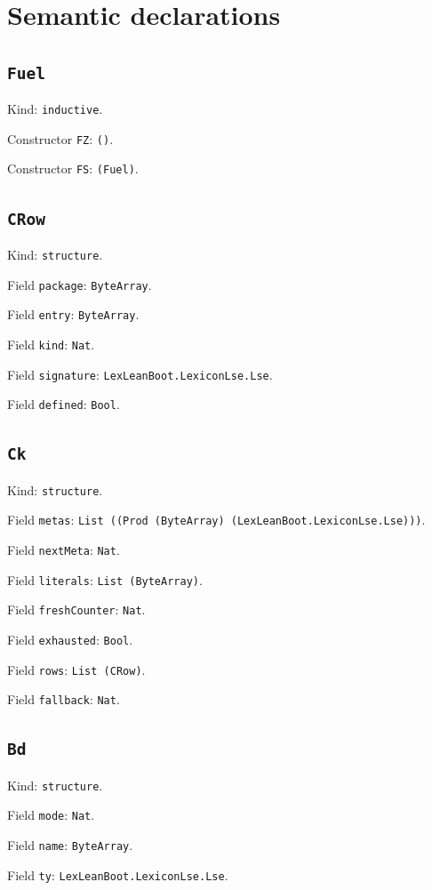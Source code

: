 \documentclass[11pt]{article}
\begin{document}
\section*{Semantic declarations}
\subsection*{\texttt{Fuel}}
\noindent Kind: \texttt{inductive}.\par
\noindent Constructor \texttt{FZ}: \texttt{()}.\par
\noindent Constructor \texttt{FS}: \texttt{(Fuel)}.\par
\subsection*{\texttt{CRow}}
\noindent Kind: \texttt{structure}.\par
\noindent Field \texttt{package}: \texttt{ByteArray}.\par
\noindent Field \texttt{entry}: \texttt{ByteArray}.\par
\noindent Field \texttt{kind}: \texttt{Nat}.\par
\noindent Field \texttt{signature}: \texttt{LexLeanBoot.LexiconLse.Lse}.\par
\noindent Field \texttt{defined}: \texttt{Bool}.\par
\subsection*{\texttt{Ck}}
\noindent Kind: \texttt{structure}.\par
\noindent Field \texttt{metas}: \texttt{List ((Prod (ByteArray) (LexLeanBoot.LexiconLse.Lse)))}.\par
\noindent Field \texttt{nextMeta}: \texttt{Nat}.\par
\noindent Field \texttt{literals}: \texttt{List (ByteArray)}.\par
\noindent Field \texttt{freshCounter}: \texttt{Nat}.\par
\noindent Field \texttt{exhausted}: \texttt{Bool}.\par
\noindent Field \texttt{rows}: \texttt{List (CRow)}.\par
\noindent Field \texttt{fallback}: \texttt{Nat}.\par
\subsection*{\texttt{Bd}}
\noindent Kind: \texttt{structure}.\par
\noindent Field \texttt{mode}: \texttt{Nat}.\par
\noindent Field \texttt{name}: \texttt{ByteArray}.\par
\noindent Field \texttt{ty}: \texttt{LexLeanBoot.LexiconLse.Lse}.\par
\end{document}
